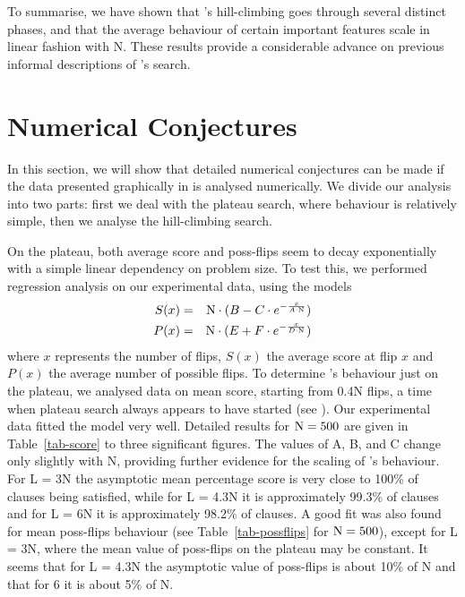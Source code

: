 To summarise, we have
shown that \GSAT's hill-climbing goes through
several distinct phases,
and that the average behaviour of certain important features 
scale in linear fashion with N.  
These results provide a considerable advance
on previous informal descriptions of \GSAT's search. 

\section{Numerical Conjectures}
\label{sec-numerical}


In this section, we will show that
detailed numerical conjectures
can be made if the data presented graphically 
in  is analysed numerically. 
We divide our analysis into two parts: 
first we deal with the plateau search, where
behaviour is relatively simple, then we analyse the
hill-climbing search.

\label{sec-regression}

\label{sec-plat}

On the plateau, both average score and poss-flips seem to 
decay exponentially with a simple linear dependency on problem size.
To test this, 
we performed regression analysis on our experimental data,
using the models 
\begin{eqnarray}
S(x) & = & \mbox{\rm N} \cdot ( B - C\cdot e^{-\frac{x}{A\cdot \mbox{\rm \tiny N}}}) \label{eq-model-score}\\
P(x) & = & \mbox{\rm N} \cdot ( E + F\cdot e^{-\frac{x}{D\cdot \mbox{\rm \tiny N}}}) \label{eq-model-pflips}
\end{eqnarray}
where $x$ represents the number of flips,  $S(x)$ the
average score at flip $x$ and $P(x)$ the average number of possible
flips.  
To determine \GSAT's behaviour just on the plateau,
we analysed data on mean score,
starting from 0.4N flips, a time when plateau search always
appears to have started (see ).  
Our experimental data fitted the model very well.
Detailed results for ${\rm N} = 500$ 
are given in Table~\ref{tab-score} to three significant figures.
The values of 
A, B, and C change only slightly with N,
providing further evidence for the scaling of \GSAT's behaviour.
For L = 3N the asymptotic mean percentage score is very close to 100\% of clauses being
satisfied, while for L = 4.3N it is approximately 99.3\% of clauses
and for L = 6N it is approximately 98.2\% of clauses.  
A good fit was also found for mean poss-flips behaviour (see
Table~\ref{tab-possflips} for ${\rm N} = 500$),
except for L = 3N, where the mean value of poss-flips on the plateau may 
be constant.  
It seems 
that for L = 4.3N the asymptotic value of poss-flips is about 10\%
of N and that for 6 it is about 5\% of N.


